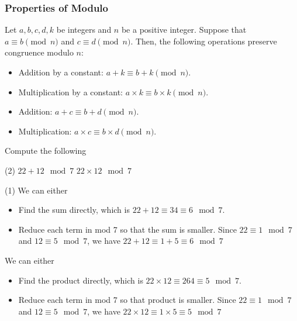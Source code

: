 \begin{frame}
\frametitle{Properties of Modulo}
\begin{prop}{}{}
Let $a,b,c,d,k$ be integers and $n$ be a positive integer. Suppose that $a \equiv b \pmod n$ and $c \equiv d \pmod n$. Then, the following operations preserve congruence modulo $n$:
\begin{itemize}
\item Addition by a constant: $a + k \equiv b + k \pmod n$.
\item Multiplication by a constant: $a \times k \equiv b \times k \pmod n$.
\item Addition: $a + c \equiv b+d \pmod n$.
\item Multiplication: $a \times c \equiv b \times d \pmod n$.
\end{itemize}
\end{prop}
\end{frame}


\begin{frame}[t]
\begin{ex}
Compute the following
\begin{tasks}(2)
\task $22 + 12 \mod 7$ 
\task $22 \times 12 \mod 7$ 
\end{tasks}
\end{ex}
\begin{sol}
\begin{tasks}(1)
\task We can either 
\begin{itemize}
\item Find the sum directly, which is $22+12 \equiv 34 \equiv 6 \mod 7$.
\item Reduce each term in mod 7 so that the sum is smaller. Since $22 \equiv 1 \mod 7$ and $12 \equiv 5 \mod 7$, we have $22 + 12 \equiv 1 + 5 \equiv 6 \mod 7$
\end{itemize}

\task We can either
\begin{itemize}
\item Find the product directly, which is $22 \times 12 \equiv 264 \equiv 5 \mod 7$.
\item Reduce each term in mod 7 so that product is smaller.  Since $22 \equiv 1 \mod 7$ and $12 \equiv 5 \mod 7$, we have $22 \times 12 \equiv 1 \times 5 \equiv 5 \mod 7$
\end{itemize}
\end{tasks}
\end{sol}
\end{frame}


